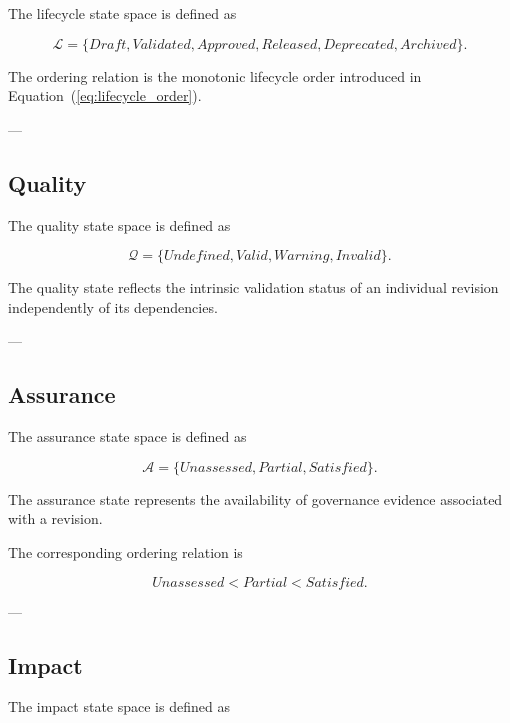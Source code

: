 \documentclass[10pt]{article}
\begin{document}
The lifecycle state space is defined as

\begin{equation}
	\mathcal{L}=
	\{
	Draft,
	Validated,
	Approved,
	Released,
	Deprecated,
	Archived
	\}.
	\label{eq:lifecycle_space}
\end{equation}

The ordering relation is the monotonic lifecycle order introduced in Equation~(\ref{eq:lifecycle_order}).

---

\subsection{Quality}

The quality state space is defined as

\begin{equation}
	\mathcal{Q}=
	\{
	Undefined,
	Valid,
	Warning,
	Invalid
	\}.
	\label{eq:quality_space}
\end{equation}

The quality state reflects the intrinsic validation status of an individual revision independently of its dependencies.

---

\subsection{Assurance}

The assurance state space is defined as

\begin{equation}
	\mathcal{A}=
	\{
	Unassessed,
	Partial,
	Satisfied
	\}.
	\label{eq:assurance_space}
\end{equation}

The assurance state represents the availability of governance evidence associated with a revision.

The corresponding ordering relation is

\begin{equation}
	Unassessed
	<
	Partial
	<
	Satisfied.
	\label{eq:assurance_order}
\end{equation}

---

\subsection{Impact}

The impact state space is defined as
\end{document}
